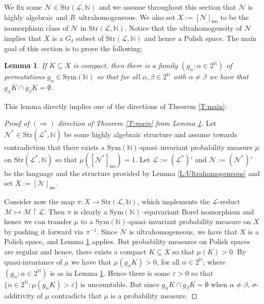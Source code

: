 \documentclass[11pt]{amsart}
\theoremstyle{plain}
\newtheorem{lemma}[theorem]{Lemma}
\theoremstyle{definition}
\begin{document}
 

We fix some  $\mathcal{N}\in\mathrm{Str}(\mathcal{L},\mathbb{N})$ and we assume throughout this section that $\mathcal{N}$ is  highly algebraic and  $R$--ultrahomogeneous. We also set  $X:=[\mathcal{N}]_{\mathrm{iso}}$ to be the isomorphism class of $\mathcal{N}$ in $\mathrm{Str}(\mathcal{L},\mathbb{N})$.  
Notice that the ultrahomogeneity of $\mathcal{N}$ implies that $X$ is a $G_{\delta}$ subset of   $\mathrm{Str}(\mathcal{L},\mathbb{N})$ and hence a Polish space. The main goal of this section is to prove the following:




\begin{lemma} \label{L:aris2}
    If $K\subseteq X$ is compact, then there is a family $(g_{\alpha}\colon \alpha\in 2^{\mathbb{N}})$ of permutations $g_{\alpha}\in \mathrm{Sym}(\mathbb{N})$ so that for all $\alpha,\beta\in 2^{\mathbb{N}}$ with $\alpha\neq \beta$ we have that $g_{\alpha} K \cap g_{\beta} K =\emptyset$.
\end{lemma}

This lemma directly implies one of the directions of Theorem \ref{T:main}:

\begin{proof}[Proof of $(\Rightarrow)$ direction of Theorem \ref{T:main} from Lemma \ref{L:aris2}]
Let  $\mathcal{N}^*\in  \mathrm{Str}(\mathcal{L}^*,\mathbb{N})$ be some highly algebraic structure and assume towards contradiction that there exists a $\mathrm{Sym}(\mathbb{N})$-quasi--invariant probability measure $\mu$ on $\mathrm{Str}(\mathcal{L}^*,\mathbb{N})$ so that $\mu([\mathcal{N}^*]_{\mathrm{iso}})=1$. Let $\mathcal{L}:=(\mathcal{L}^*)'$ and  $\mathcal{N}:=(\mathcal{N}^*)'$ be the language and the structure provided by Lemma \ref{L:Ultrahomogeneous} and set $X:=[\mathcal{N}]_{\mathrm{iso}}$.

Consider now the map $\pi\colon X \to \mathrm{Str}(\mathcal{L},\mathbb{N})$,  which implements the $\mathcal{L}$-reduct $\mathcal{M}\mapsto \mathcal{M}\upharpoonright \mathcal{L}$.  Then $\pi$ is clearly a  $\mathrm{Sym}(\mathbb{N})$--equivariant Borel isomorphism and hence we can transfer  $\mu$ to a  $\mathrm{Sym}(\mathbb{N})$-quasi--invariant probability measure on $X$ by pushing it forward via $\pi^{-1}$. Since  $\mathcal{N}$ is ultrahomogeneous, we have that $X$ is a Polish space, and Lemma \ref{L:aris2} applies. But probability measures on Polish spaces are regular and hence, there exists a compact $K\subseteq X$ so that $\mu(K)>0$. By quasi-invariance of $\mu$ we have that $\mu(g_{\alpha}K)>0$, for all $\alpha\in 2^{\mathbb{N}}$; where $(g_{\alpha}\colon \alpha\in 2^{\mathbb{N}})$ is as in Lemma \ref{L:aris2}. Hence there is some $\varepsilon>0$ so that $\{\alpha \in 2^{\mathbb{N}}\colon \mu(g_\alpha K)>\varepsilon \}$ is uncountable. But since $g_{\alpha} K \cap g_{\beta} K =\emptyset$ when $\alpha\neq \beta$, $\sigma$-additivity of $\mu$ contradicts that $\mu$ is a probability measure.
\end{proof}
\end{document}

